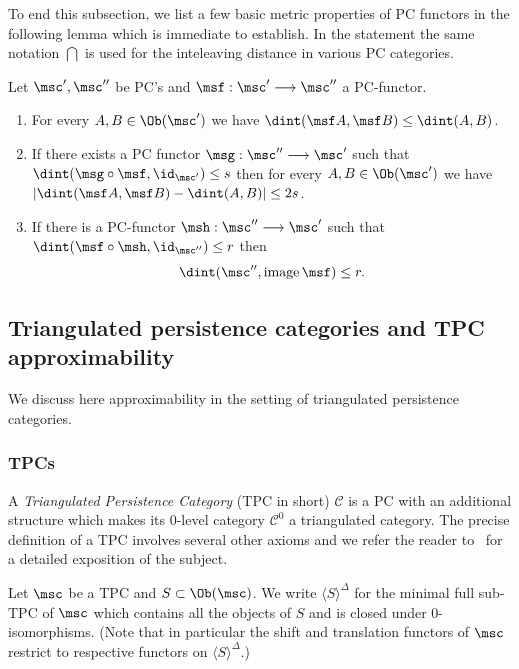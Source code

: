 To end this subsection, we list a few basic metric properties of PC
functors in the following lemma which is immediate to establish. In
the statement the same notation $\dint$ is used for the inteleaving
distance in various PC categories.
\begin{lem} \label{l:d-func} Let $\msc', \msc''$ be PC's and
  $\msf: \msc' \longrightarrow \msc''$ a PC-functor.
  \begin{enumerate}
  \item For every $A, B \in \Ob(\msc')$ we have
    $\dint(\msf A, \msf B) \leq \dint(A,B)$.
  \item If there exists a PC functor
    $\msg: \msc'' \longrightarrow \msc'$ such that
    $\dint(\msg \circ \msf, \id_{\msc'}) \leq s$ then for every
    $A, B \in \Ob(\msc')$ we have
    $|\dint(\msf A, \msf B) - \dint (A,B)| \leq 2s$.
  \item If there is a PC-functor $\msh: \msc'' \longrightarrow \msc'$
    such that $\dint(\msf \circ \msh, \id_{\msc''}) \leq r$ then
    $$\dint(\msc'', \textnormal{image\,}\msf) \leq r.$$
  \end{enumerate}
\end{lem}




\subsection{Triangulated persistence categories and TPC
  approximability}\label{subsec:TPC_approx}
We discuss here approximability in the setting of triangulated
persistence categories.

\subsubsection{TPCs} \label{sb:tpc} A {\em Triangulated Persistence
  Category} (TPC in short) $\mathscr{C}$ is a PC with an additional
structure which makes its $0$-level category $\mathscr{C}^0$ a
triangulated category. The precise definition of a TPC involves
several other axioms and we refer the reader to~\cite{BCZ:tpc} for a
detailed exposition of the subject.

Let $\msc$ be a TPC and $S \subset \Ob(\msc)$. We write
$\langle S \rangle^{\Delta}$ for the minimal full sub-TPC of $\msc$
which contains all the objects of $S$ and is closed under
$0$-isomorphisms. (Note that in particular the shift and translation
functors of $\msc$ restrict to respective functors on
$\langle S \rangle^{\Delta}$.) 

